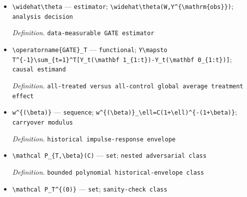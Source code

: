 \documentclass{article}
\begin{document}
\begin{itemize}
  \par\smallskip\noindent\emph{Definition.} \texttt{possibly outcome-\allowbreak{}adaptive sequential assignment rule}
  \item \texttt{\textbackslash{}\allowbreak{}widehat\textbackslash{}\allowbreak{}theta} --- \texttt{estimator}; \texttt{\textbackslash{}\allowbreak{}widehat\textbackslash{}\allowbreak{}theta(W,\allowbreak{}Y\textasciicircum{}\{\textbackslash{}\allowbreak{}mathrm\{obs\}\allowbreak{}\}\allowbreak{})}; \texttt{analysis decision}
  \par\smallskip\noindent\emph{Definition.} \texttt{data-\allowbreak{}measurable GATE estimator}
  \item \texttt{\textbackslash{}\allowbreak{}operatorname\{GATE\}\allowbreak{}\_\allowbreak{}T} --- \texttt{functional}; \texttt{Y\textbackslash{}\allowbreak{}mapsto T\textasciicircum{}\{-\allowbreak{}1\}\allowbreak{}\textbackslash{}\allowbreak{}sum\_\allowbreak{}\{t=\allowbreak{}1\}\allowbreak{}\textasciicircum{}T[Y\_\allowbreak{}t(\textbackslash{}\allowbreak{}mathbf 1\_\allowbreak{}\{1:\allowbreak{}t\}\allowbreak{})-\allowbreak{}Y\_\allowbreak{}t(\textbackslash{}\allowbreak{}mathbf 0\_\allowbreak{}\{1:\allowbreak{}t\}\allowbreak{})]}; \texttt{causal estimand}
  \par\smallskip\noindent\emph{Definition.} \texttt{all-\allowbreak{}treated versus all-\allowbreak{}control global average treatment effect}
  \item \texttt{w\textasciicircum{}\{(\textbackslash{}\allowbreak{}beta)\}\allowbreak{}} --- \texttt{sequence}; \texttt{w\textasciicircum{}\{(\textbackslash{}\allowbreak{}beta)\}\allowbreak{}\_\allowbreak{}\textbackslash{}\allowbreak{}ell=\allowbreak{}C(1+\allowbreak{}\textbackslash{}\allowbreak{}ell)\textasciicircum{}\{-\allowbreak{}(1+\allowbreak{}\textbackslash{}\allowbreak{}beta)\}\allowbreak{}}; \texttt{carryover modulus}
  \par\smallskip\noindent\emph{Definition.} \texttt{historical impulse-\allowbreak{}response envelope}
  \item \texttt{\textbackslash{}\allowbreak{}mathcal P\_\allowbreak{}\{T,\allowbreak{}\textbackslash{}\allowbreak{}beta\}\allowbreak{}(C)} --- \texttt{set}; \texttt{nested adversarial class}
  \par\smallskip\noindent\emph{Definition.} \texttt{bounded polynomial historical-\allowbreak{}envelope class}
  \item \texttt{\textbackslash{}\allowbreak{}mathcal P\_\allowbreak{}T\textasciicircum{}\{(0)\}\allowbreak{}} --- \texttt{set}; \texttt{sanity-\allowbreak{}check class}

\end{itemize}
\end{document}
